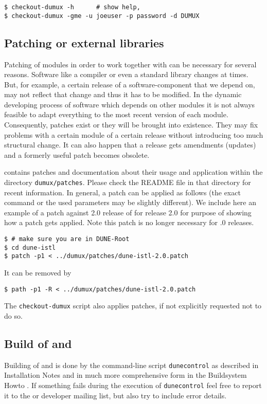 \begin{lstlisting}[style=Bash]
$ checkout-dumux -h      # show help,
$ checkout-dumux -gme -u joeuser -p password -d DUMUX 
\end{lstlisting}

\subsection{Patching \Dune or external libraries}
Patching of \Dune modules in order to work together with \Dumux
can be necessary for several reasons.
Software like a compiler or even a standard library
changes at times. But, for example, a certain release of a software-component that we depend on, may not reflect that change and thus it has to be modified.
In the dynamic developing process of software which depends on other modules it is not always feasible 
to adapt everything to the most recent version of each module. Consequently, patches exist or they will be brought into existence. They may fix problems with a certain module
of a certain release without introducing too much structural change. It can also happen 
that a release gets amendments (updates) and a formerly useful patch becomes obsolete.

\Dumux contains patches and documentation about their usage and application within the directory \texttt{dumux/patches}.
Please check the README file in that directory for recent information. 
In general, a patch can be applied as follows (the exact command or the used parameters may be slightly different).
We include here an example of a patch against 2.0 release of \Dune for \Dumux release 2.0 for purpose of showing how a patch gets applied. Note this patch is no longer necessary for .0 releases.

\begin{lstlisting}[style=Bash]
$ # make sure you are in DUNE-Root
$ cd dune-istl
$ patch -p1 < ../dumux/patches/dune-istl-2.0.patch
\end{lstlisting}

It can be removed by 
\begin{lstlisting}[style=Bash]
$ path -p1 -R < ../dumux/patches/dune-istl-2.0.patch
\end{lstlisting}

The \texttt{checkout-dumux} script also applies patches, if not explicitly requested not to do so.

\subsection{Build of \Dune and \Dumux}
\label{buildIt}
Building of \Dune and \Dumux is done by the command-line script \texttt{dunecontrol} as described in \Dune Installation Notes \cite{DUNE-INST}
and in much more comprehensive form in the \Dune Buildsystem Howto \cite{DUNE-BS}.
If something fails during the execution of \texttt{dunecontrol} feel free to report it to the \Dune or \Dumux developer mailing list,
but also try to include error details.\\

